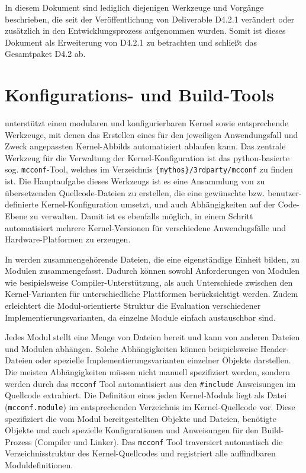 In diesem Dokument sind lediglich diejenigen Werkzeuge und Vorgänge beschrieben,
die seit der Veröffentlichung von Deliverable D4.2.1 verändert oder zusätzlich in den
Entwicklungsprozess aufgenommen wurden. Somit ist dieses Dokument als
Erweiterung von D4.2.1 zu betrachten und schließt das Gesamtpaket D4.2 ab.

\section{Konfigurations- und Build-Tools}

\mythos unterstützt einen modularen und konfigurierbaren Kernel sowie
entsprechende Werkzeuge, mit denen das Erstellen eines für den jeweiligen
Anwendungsfall und Zweck angepassten Kernel-Abbilds automatisiert ablaufen kann.
Das zentrale Werkzeug für die Verwaltung der Kernel-Konfiguration ist das
python-basierte sog. \texttt{mcconf}-Tool, welches im Verzeichnis
\texttt{\{mythos\}/3rdparty/mcconf} zu finden ist. Die Hauptaufgabe
dieses Werkzeugs ist es eine Ansammlung von zu übersetzenden Quellcode-Dateien
zu erstellen, die eine gewünschte bzw. benutzer-definierte Kernel-Konfiguration
umsetzt, und auch Abhängigkeiten auf der Code-Ebene zu verwalten. Damit ist
es ebenfalls möglich, in einem Schritt automatisiert mehrere Kernel-Versionen
für verschiedene Anwendugsfälle und Hardware-Platformen zu erzeugen.

In \mythos werden zusammengehörende Dateien, die eine eigenständige Einheit
bilden, zu Modulen zusammengefasst. Dadurch können sowohl Anforderungen von
Modulen wie besipielsweise Compiler-Unterstützung, als auch Unterschiede
zwischen den Kernel-Varianten für unterschiedliche Plattformen berücksichtigt
werden. Zudem erleichtert die Modul-orientierte Struktur die Evaluation
verschiedener Implementierungsvarianten, da einzelne Module einfach austauschbar
sind.

Jedes Modul stellt eine Menge von Dateien bereit und kann von anderen Dateien
und Modulen abhängen. Solche Abhängigkeiten können beispielsweise Header-Dateien
oder spezielle Implementierungsvarianten einzelner Objekte darstellen. Die
meisten Abhängigkeiten müssen nicht manuell spezifiziert werden, sondern werden
durch das \texttt{mcconf} Tool automatisiert aus den \texttt{\#include}
Anweisungen im Quellcode extrahiert. Die Definition eines jeden Kernel-Moduls
liegt als Datei (\texttt{mcconf.module}) im entsprechenden Verzeichnis im
Kernel-Quellcode vor. Diese spezifiziert die vom Modul bereitgestellten
Objekte und Dateien, benötigte Objekte und auch spezielle Konfigurationen und
Anweisungen für den Build-Prozess (Compiler und Linker). Das \texttt{mcconf}
Tool traversiert automatisch die Verzeichnisstruktur des Kernel-Quellcodes
und registriert alle auffindbaren Moduldefinitionen.


